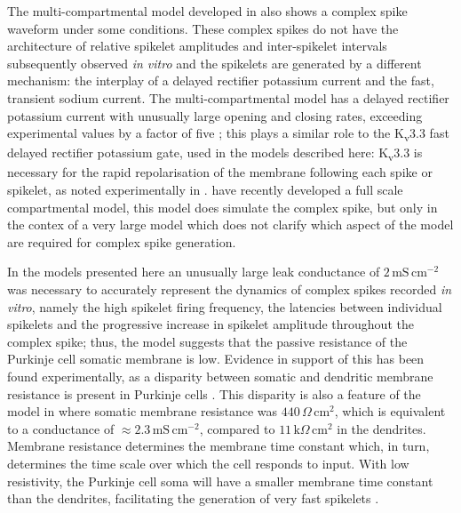 \documentclass[twocolumn]{svjour3}          %
\newcommand{\msi}{\,\mathrm{mS\,cm^{-2}}}
\begin{document}
The multi-compartmental model developed in
\citet{DeSchutterBower1994a,DeSchutterBower1994b,DeSchutterBower1994c}
also shows a complex spike waveform under some conditions. These
complex spikes do not have the architecture of relative spikelet
amplitudes and inter-spikelet intervals subsequently observed
\textit{in vitro} and the spikelets are generated by a different
mechanism: the interplay of a delayed rectifier potassium current and
the fast, transient sodium current. The multi-compartmental model has
a delayed rectifier potassium current with unusually large opening and
closing rates, exceeding experimental values by a factor of five
\citep{YamadaEtAl1989}; this plays a similar role to the
K\textsubscript{v}3.3 fast delayed rectifier potassium gate,
\citep{VeysEtAl2013,ZaghaEtAl2008} used in the models described here:
K\textsubscript{v}3.3 is necessary for the rapid repolarisation of the
membrane following each spike or spikelet, as noted experimentally in
\citet{ZaghaEtAl2008,VeysEtAl2013}. \citet{ZangEtAl2018} have recently
developed a full scale compartmental model, this model does simulate
the complex spike, but only in the contex of a very large model which
does not clarify which aspect of the model are required for complex
spike generation.

In the models presented here an unusually large leak conductance of
$2\msi$ was necessary to accurately represent the dynamics of complex
spikes recorded \textit{in vitro}, namely the high spikelet firing
frequency, the latencies between individual spikelets and the
progressive increase in spikelet amplitude throughout the complex
spike; thus, the model suggests that the passive resistance of the
Purkinje cell somatic membrane is low. Evidence in support of this has
been found experimentally, as a disparity between somatic and
dendritic membrane resistance is present in Purkinje cells
\citep{RappEtAl1994}. This disparity is also a feature of the model in
\citet{DeSchutterBower1994a,DeSchutterBower1994b,DeSchutterBower1994c}
where somatic membrane resistance was $440\,\Omega\,\mathrm{cm}^2$,
which is equivalent to a conductance of $\approx 2.3\msi$, compared to
$11\,\mathrm{k}\Omega\,\mathrm{cm}^2$ in the dendrites. Membrane
resistance determines the membrane time constant which, in turn,
determines the time scale over which the cell responds to input. With
low resistivity, the Purkinje cell soma will have a smaller membrane
time constant than the dendrites, facilitating the generation of very
fast spikelets \citep{WarnaarEtAl2015}.
\end{document}
